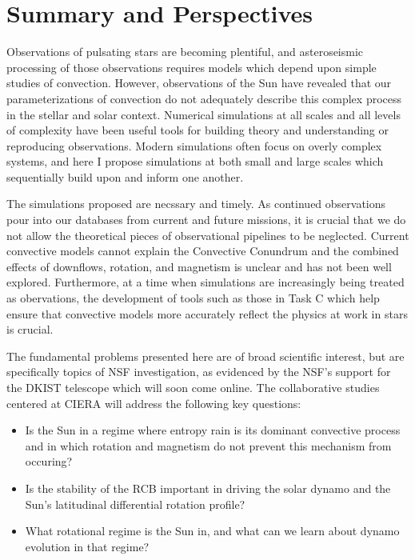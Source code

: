\documentclass[11pt, preprint]{aastex}
\begin{document}
\section{Summary and Perspectives}
\vspace{-6pt}
Observations of pulsating stars are becoming plentiful, and asteroseismic processing of those observations requires models which depend upon simple studies of convection.
However, observations of the Sun have revealed that our parameterizations of convection do not adequately describe this complex process in the stellar and solar context.
Numerical simulations at all scales and all levels of complexity have been useful tools for building theory and understanding or reproducing observations.
Modern simulations often focus on overly complex systems, and here I propose simulations at both small and large scales which sequentially build upon and inform one another.

The simulations proposed are necssary and timely.
As continued observations pour into our databases from current and future missions, it is crucial that we do not allow the theoretical pieces of observational pipelines to be neglected.
Current convective models cannot explain the Convective Conundrum and the combined effects of downflows, rotation, and magnetism is unclear and has not been well explored.
Furthermore, at a time when simulations are increasingly being treated as obervations, the development of tools such as those in Task C which help ensure that convective models more accurately reflect the physics at work in stars is crucial.

The fundamental problems presented here are of broad scientific interest, but are specifically topics of NSF investigation, as evidenced by the NSF's support for the DKIST telescope which will soon come online.
The collaborative studies centered at CIERA will address the following key questions:
\begin{itemize}
\vspace{-9pt}
\item Is the Sun in a regime where entropy rain is its dominant convective process and in which rotation and magnetism do not prevent this mechanism from occuring?
\vspace{-9pt}
\item Is the stability of the RCB important in driving the solar dynamo and the Sun's latitudinal differential rotation profile?
\vspace{-9pt}
\item What rotational regime is the Sun in, and what can we learn about dynamo evolution in that regime?
\vspace{-9pt}
\end{itemize}
\end{document}
